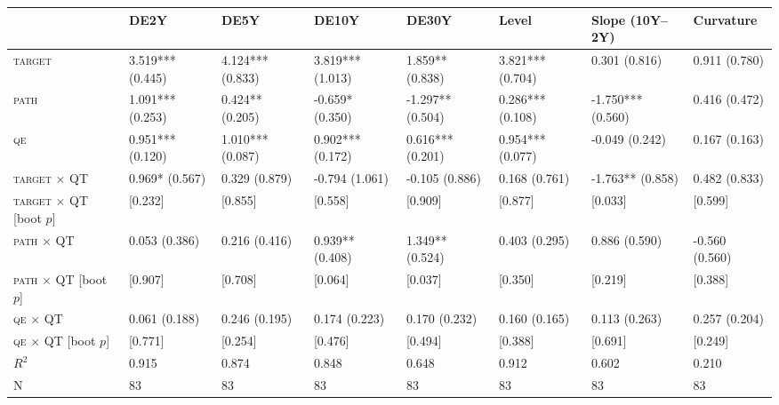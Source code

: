 \begin{tabular}{llllllll}
\toprule
 & DE2Y & DE5Y & DE10Y & DE30Y & Level & Slope (10Y--2Y) & Curvature \\
\midrule
\textsc{target} & 3.519*** (0.445) & 4.124*** (0.833) & 3.819*** (1.013) & 1.859** (0.838) & 3.821*** (0.704) & 0.301 (0.816) & 0.911 (0.780) \\
\textsc{path} & 1.091*** (0.253) & 0.424** (0.205) & -0.659* (0.350) & -1.297** (0.504) & 0.286*** (0.108) & -1.750*** (0.560) & 0.416 (0.472) \\
\textsc{qe} & 0.951*** (0.120) & 1.010*** (0.087) & 0.902*** (0.172) & 0.616*** (0.201) & 0.954*** (0.077) & -0.049 (0.242) & 0.167 (0.163) \\
\textsc{target} $\times$ QT & 0.969* (0.567) & 0.329 (0.879) & -0.794 (1.061) & -0.105 (0.886) & 0.168 (0.761) & -1.763** (0.858) & 0.482 (0.833) \\
\textsc{target} $\times$ QT [boot $p$] & [0.232] & [0.855] & [0.558] & [0.909] & [0.877] & [0.033] & [0.599] \\
\textsc{path} $\times$ QT & 0.053 (0.386) & 0.216 (0.416) & 0.939** (0.408) & 1.349** (0.524) & 0.403 (0.295) & 0.886 (0.590) & -0.560 (0.560) \\
\textsc{path} $\times$ QT [boot $p$] & [0.907] & [0.708] & [0.064] & [0.037] & [0.350] & [0.219] & [0.388] \\
\textsc{qe} $\times$ QT & 0.061 (0.188) & 0.246 (0.195) & 0.174 (0.223) & 0.170 (0.232) & 0.160 (0.165) & 0.113 (0.263) & 0.257 (0.204) \\
\textsc{qe} $\times$ QT [boot $p$] & [0.771] & [0.254] & [0.476] & [0.494] & [0.388] & [0.691] & [0.249] \\
$R^2$ & 0.915 & 0.874 & 0.848 & 0.648 & 0.912 & 0.602 & 0.210 \\
N & 83 & 83 & 83 & 83 & 83 & 83 & 83 \\
\bottomrule
\end{tabular}
